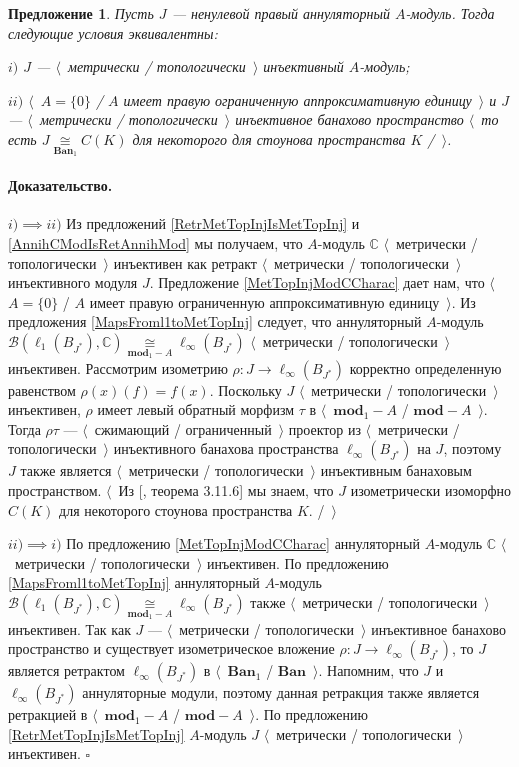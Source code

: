 \documentclass[12pt]{article}
\newcommand{\isom}[1]{\mathop{\mathbin{\cong}}\limits_{#1}}
\newtheorem{proposition}[theorem]{Предложение}
\renewenvironment{proof}{\paragraph{Доказательство.}}{\hfill$\square$\medskip}
\begin{document}
\begin{proposition}\label{MetTopInjOfAnnihModCharac} Пусть $J$ --- ненулевой правый аннуляторный $A$-модуль. Тогда следующие условия эквивалентны:

$i)$ $J$ --- $\langle$~метрически / топологически~$\rangle$ инъективный $A$-модуль;

$ii)$ $\langle$~$A=\{0\}$ / $A$ имеет правую ограниченную аппроксимативную единицу~$\rangle$ и $J$ ---  $\langle$~метрически / топологически~$\rangle$ инъективное банахово пространство $\langle$~то есть $J\isom{\mathbf{Ban}_1}C(K)$ для некоторого для стоунова пространства $K$ /~$\rangle$.
\end{proposition}
\begin{proof} $i)$$\implies$$ ii)$  Из предложений \ref{RetrMetTopInjIsMetTopInj} и \ref{AnnihCModIsRetAnnihMod} мы получаем, что $A$-модуль $\mathbb{C}$ $\langle$~метрически / топологически~$\rangle$ инъективен как ретракт $\langle$~метрически / топологически~$\rangle$ инъективного модуля $J$. Предложение \ref{MetTopInjModCCharac} дает нам, что $\langle$~$A=\{0\}$ / $A$ имеет правую ограниченную аппроксимативную единицу~$\rangle$. Из предложения \ref{MapsFroml1toMetTopInj} следует, что аннуляторный $A$-модуль $\mathcal{B}(\ell_1(B_{J^*}),\mathbb{C})\isom{\mathbf{mod}_1-A}\ell_\infty(B_{J^*})$ $\langle$~метрически / топологически~$\rangle$ инъективен. Рассмотрим изометрию $\rho:J\to\ell_\infty(B_{J^*})$ корректно определенную равенством $\rho(x)(f)=f(x)$. Поскольку $J$ $\langle$~метрически / топологически~$\rangle$ инъективен, $\rho$ имеет левый обратный морфизм $\tau$ в $\langle$~$\mathbf{mod}_1-A$ / $\mathbf{mod}-A$~$\rangle$. Тогда $\rho\tau$ --- $\langle$~сжимающий / ограниченный~$\rangle$ проектор из $\langle$~метрически / топологически~$\rangle$ инъективного банахова пространства $\ell_\infty(B_{J^*})$ на $J$, поэтому $J$ также является $\langle$~метрически / топологически~$\rangle$ инъективным банаховым пространством. $\langle$~Из [\cite{LaceyIsomThOfClassicBanSp}, теорема 3.11.6] мы знаем, что $J$ изометрически изоморфно $C(K)$ для некоторого стоунова пространства $K$. /~$\rangle$ 

$ii)$$\implies$$ i)$ По предложению \ref{MetTopInjModCCharac} аннуляторный $A$-модуль $\mathbb{C}$ $\langle$~метрически / топологически~$\rangle$ инъективен. По предложению \ref{MapsFroml1toMetTopInj} аннуляторный $A$-модуль $\mathcal{B}(\ell_1(B_{J^*}),\mathbb{C})\isom{\mathbf{mod}_1-A}\ell_\infty(B_{J^*})$ также $\langle$~метрически / топологически~$\rangle$ инъективен. Так как $J$ --- $\langle$~метрически / топологически~$\rangle$ инъективное банахово пространство и существует изометрическое вложение $\rho:J\to \ell_\infty(B_{J^*})$, то $J$ является ретрактом $\ell_\infty(B_{J^*})$ в $\langle$~$\mathbf{Ban}_1$ / $\mathbf{Ban}$~$\rangle$. Напомним, что $J$ и $\ell_\infty(B_{J^*})$ аннуляторные модули, поэтому данная ретракция также является ретракцией в $\langle$~$\mathbf{mod}_1-A$ / $\mathbf{mod}-A$~$\rangle$. По предложению \ref{RetrMetTopInjIsMetTopInj} $A$-модуль $J$ $\langle$~метрически / топологически~$\rangle$ инъективен.
\end{proof}
\end{document}
